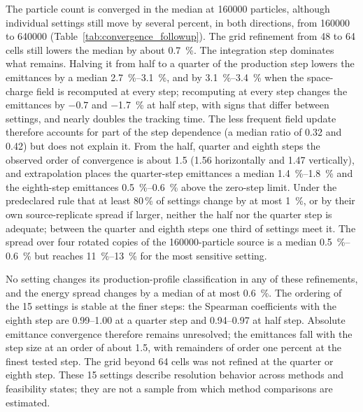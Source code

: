 \documentclass[aps,prab,reprint,superscriptaddress,amsmath,amssymb,floatfix]{revtex4-2}
\begin{document}
The particle count is converged in the median at \num{160000} particles, although individual
settings still move by several percent, in both directions, from \num{160000} to
\num{640000} (Table~\ref{tab:convergence_followup}). The grid refinement from 48 to 64 cells
still lowers the median by about \SI{0.7}{\percent}. The integration step dominates what remains.
Halving it from half to a quarter of the production step lowers the emittances by a median
\SIrange{2.7}{3.1}{\percent}, and by \SIrange{3.1}{3.4}{\percent} when the space-charge field
is recomputed at every step; recomputing at every step changes the emittances by $-0.7$ and
\SI{-1.7}{\percent} at half step, with signs that differ between settings, and nearly doubles the
tracking time. The less frequent field update therefore accounts for part of the step
dependence (a median ratio of 0.32 and 0.42) but does not explain it. From the half, quarter
and eighth steps the observed order of convergence is about 1.5 (1.56 horizontally and 1.47
vertically), and extrapolation places the quarter-step emittances a median
\SIrange{1.4}{1.8}{\percent} and the eighth-step emittances \SIrange{0.5}{0.6}{\percent} above
the zero-step limit. Under the predeclared rule that at least 80\,\% of settings change by at
most \SI{1}{\percent}, or by their own source-replicate spread if larger, neither the half nor
the quarter step is adequate; between the quarter and eighth steps one third of settings meet
it. The spread over four rotated copies of the \num{160000}-particle source is a median
\SIrange{0.5}{0.6}{\percent} but reaches \SIrange{11}{13}{\percent} for the most sensitive
setting.

No setting changes its production-profile classification in any of these refinements, and the
energy spread changes by a median of at most \SI{0.6}{\percent}. The ordering of the 15 settings
is stable at the finer steps: the Spearman coefficients with the eighth step are 0.99--1.00 at
a quarter step and 0.94--0.97 at half step. Absolute emittance convergence therefore remains
unresolved; the emittances fall with the step size at an order of about 1.5, with remainders of
order one percent at the finest tested step. The grid beyond 64 cells was not refined at the
quarter or eighth step. These 15 settings describe resolution behavior across methods and
feasibility states; they are not a sample from which method comparisons are estimated.
\end{document}
